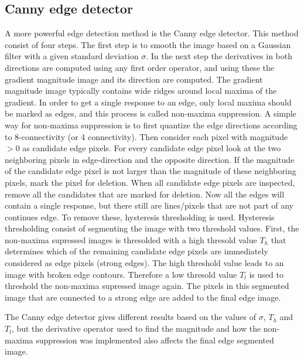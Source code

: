 \subsection{Canny edge detector}
A more powerful edge detection method is the Canny edge detector. This method consist of four steps. The first step is to smooth the image based on a Gaussian filter with a given standard deviation \(\sigma\). In the next step the derivatives in both directions are computed using any first order operator, and using these the gradient magnitude image and its direction are computed. The gradient magnitude image typically contains wide ridges around local maxima of the gradient. In order to get a single response to an edge, only local maxima should be marked as edges, and this process is called non-maxima suppression. A simple way for non-maxima suppression is to first quantize the edge directions according to 8-connectivity (or 4 connectivity). Then consider each pixel with magnitude \(> 0\) as candidate edge pixels. For every candidate edge pixel look at the two neighboring pixels in edge-direction and the opposite direction. If the magnitude of the candidate edge pixel is not larger than the magnitude of these neighboring pixels, mark the pixel for deletion. When all candidate edge pixels are inspected, remove all the candidates that are marked for deletion. Now all the edges will contain a single response, but there still are lines/pixels that are not part of any continues edge. To remove these, hysteresis thresholding is used. Hysteresis thresholding consist of segmenting the image with two threshold values. First, the non-maxima supressed images is thresolded with a high thresold value \(T_h\) that determines which of the remaining candidate edge pixels are immediately considered as edge pixels (strong edges). The high threshold value leads to an image with broken edge contours. Therefore a low thresold value \(T_l\) is used to threshold the non-maxima supressed image again. The pixels in this segmented image that are connected to a strong edge are added to the final edge image.

The Canny edge detector gives different results based on the values of \(\sigma\), \(T_h\) and \(T_l\), but the derivative operator used to find the magnitude and how the non-maxima suppression was implemented also affects the final edge segmented image.